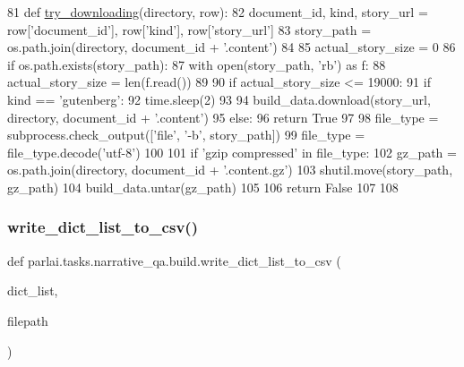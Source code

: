 \begin{DoxyCode}
81 \textcolor{keyword}{def }\hyperlink{namespaceparlai_1_1tasks_1_1narrative__qa_1_1build_a9af345566fd27c286f7fef146b2cf00b}{try\_downloading}(directory, row):
82     document\_id, kind, story\_url = row[\textcolor{stringliteral}{'document\_id'}], row[\textcolor{stringliteral}{'kind'}], row[\textcolor{stringliteral}{'story\_url'}]
83     story\_path = os.path.join(directory, document\_id + \textcolor{stringliteral}{'.content'})
84 
85     actual\_story\_size = 0
86     \textcolor{keywordflow}{if} os.path.exists(story\_path):
87         with open(story\_path, \textcolor{stringliteral}{'rb'}) \textcolor{keyword}{as} f:
88             actual\_story\_size = len(f.read())
89 
90     \textcolor{keywordflow}{if} actual\_story\_size <= 19000:
91         \textcolor{keywordflow}{if} kind == \textcolor{stringliteral}{'gutenberg'}:
92             time.sleep(2)
93 
94         build\_data.download(story\_url, directory, document\_id + \textcolor{stringliteral}{'.content'})
95     \textcolor{keywordflow}{else}:
96         \textcolor{keywordflow}{return} \textcolor{keyword}{True}
97 
98     file\_type = subprocess.check\_output([\textcolor{stringliteral}{'file'}, \textcolor{stringliteral}{'-b'}, story\_path])
99     file\_type = file\_type.decode(\textcolor{stringliteral}{'utf-8'})
100 
101     \textcolor{keywordflow}{if} \textcolor{stringliteral}{'gzip compressed'} \textcolor{keywordflow}{in} file\_type:
102         gz\_path = os.path.join(directory, document\_id + \textcolor{stringliteral}{'.content.gz'})
103         shutil.move(story\_path, gz\_path)
104         build\_data.untar(gz\_path)
105 
106     \textcolor{keywordflow}{return} \textcolor{keyword}{False}
107 
108 
\end{DoxyCode}
\mbox{\label{namespaceparlai_1_1tasks_1_1narrative__qa_1_1build_ab49502ac724edd933f89bec8f414b452}} 
\subsubsection{\texorpdfstring{write\+\_\+dict\+\_\+list\+\_\+to\+\_\+csv()}{write\_dict\_list\_to\_csv()}}
{\footnotesize\ttfamily def parlai.\+tasks.\+narrative\+\_\+qa.\+build.\+write\+\_\+dict\+\_\+list\+\_\+to\+\_\+csv (\begin{DoxyParamCaption}\item[{}]{dict\+\_\+list,  }\item[{}]{filepath }\end{DoxyParamCaption})}



